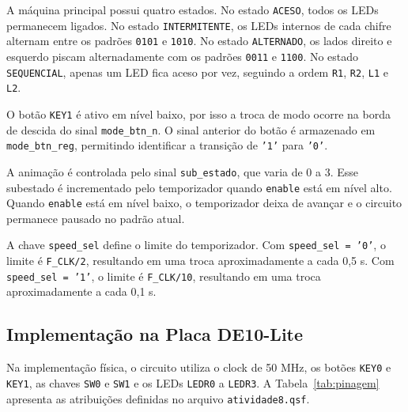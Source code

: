 \documentclass[12pt,a4paper, brazil]{article}
\begin{document}
A máquina principal possui quatro estados. No estado \texttt{ACESO}, todos os LEDs permanecem ligados. No estado \texttt{INTERMITENTE}, os LEDs internos de cada chifre alternam entre os padrões \texttt{0101} e \texttt{1010}. No estado \texttt{ALTERNADO}, os lados direito e esquerdo piscam alternadamente com os padrões \texttt{0011} e \texttt{1100}. No estado \texttt{SEQUENCIAL}, apenas um LED fica aceso por vez, seguindo a ordem \texttt{R1}, \texttt{R2}, \texttt{L1} e \texttt{L2}.

O botão \texttt{KEY1} é ativo em nível baixo, por isso a troca de modo ocorre na borda de descida do sinal \texttt{mode\_btn\_n}. O sinal anterior do botão é armazenado em \texttt{mode\_btn\_reg}, permitindo identificar a transição de \texttt{'1'} para \texttt{'0'}.

A animação é controlada pelo sinal \texttt{sub\_estado}, que varia de 0 a 3. Esse subestado é incrementado pelo temporizador quando \texttt{enable} está em nível alto. Quando \texttt{enable} está em nível baixo, o temporizador deixa de avançar e o circuito permanece pausado no padrão atual.

A chave \texttt{speed\_sel} define o limite do temporizador. Com \texttt{speed\_sel = '0'}, o limite é \texttt{F\_CLK/2}, resultando em uma troca aproximadamente a cada 0,5 s. Com \texttt{speed\_sel = '1'}, o limite é \texttt{F\_CLK/10}, resultando em uma troca aproximadamente a cada 0,1 s.

\subsection{Implementação na Placa DE10-Lite}

Na implementação física, o circuito utiliza o clock de 50 MHz, os botões \texttt{KEY0} e \texttt{KEY1}, as chaves \texttt{SW0} e \texttt{SW1} e os LEDs \texttt{LEDR0} a \texttt{LEDR3}. A Tabela~\ref{tab:pinagem} apresenta as atribuições definidas no arquivo \texttt{atividade8.qsf}.
\end{document}

